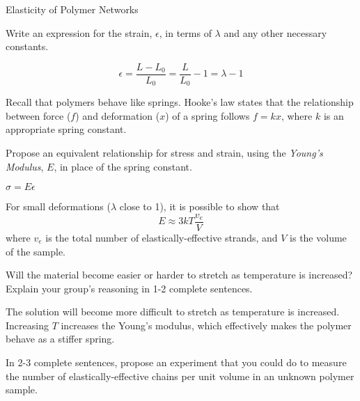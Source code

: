 \begin{activity}{Elasticity of Polymer Networks}
\begin{ctqs}
	\question Write an expression for the strain, $\epsilon$, in terms of $\lambda$ and any other necessary constants.
	
		\begin{solution}[0.8in]
			\begin{equation*}
				\epsilon = \frac{L-L_0}{L_0} = \frac{L}{L_0} -1 = \lambda - 1
			\end{equation*}
		\end{solution}
		
	\question Recall that polymers behave like springs.  Hooke's law states that the relationship between force ($f$) and deformation ($x$) of a spring follows $f=kx$, where $k$ is an appropriate spring constant.
	
		Propose an equivalent relationship for stress and strain, using the \emph{Young's Modulus}, $E$, in place of the spring constant.
		
		\label{\labelbase:ctq:sigmaEeps}
		
			\begin{solution}[0.5in]
			
				$\sigma = E\epsilon$
				
			\end{solution}
	
\end{ctqs}

\begin{infobox}
	For small deformations ($\lambda$ close to 1), it is possible to show that
	\begin{equation*}
		E \approx 3kT\frac{v_e}{V}
		\label{\labelbase:eqn:youngsmodulus}
	\end{equation*}
	where $v_e$ is the total number of elastically-effective strands, and $V$ is the volume of the sample.
\end{infobox}

\begin{ctqs}
	\question Will the material become easier or harder to stretch as temperature is increased?  Explain your group's reasoning in 1-2 complete sentences.
	
		\begin{solution}[1.5in]
			The solution will become more difficult to stretch as temperature is increased.  Increasing $T$ increases the Young's modulus, which effectively makes the polymer behave as a stiffer spring.
		\end{solution}
	
	\question In 2-3 complete sentences, propose an experiment that you could do to measure the number of elastically-effective chains per unit volume in an unknown polymer sample.
	

\end{ctqs}
\end{activity}
